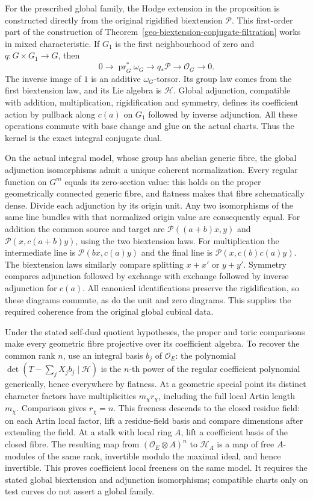 For the prescribed global family, the Hodge extension in the proposition
is constructed directly from the original rigidified biextension
$\mathcal P$. This first-order part of the construction of
Theorem~\ref{geo-biextension-conjugate-filtration} works in mixed
characteristic. If $G_1$ is the first neighbourhood of zero and
$q:G\times G_1\to G$, then
\[
 0\longrightarrow\operatorname{pr}_G^*\omega_G
 \longrightarrow q_*\mathcal P\longrightarrow\mathcal O_G
 \longrightarrow0.
\]
The inverse image of $1$ is an additive $\omega_G$-torsor. Its group
law comes from the first biextension law, and its Lie algebra is
$\mathcal H$. Global adjunction, compatible with addition,
multiplication, rigidification and symmetry, defines its coefficient
action by pullback along $c(a)$ on $G_1$ followed by inverse adjunction.
All these operations commute with base change and glue on the actual
charts. Thus the kernel is the exact integral conjugate dual.

On the actual integral model, whose group has abelian generic fibre,
the global adjunction isomorphisms admit a unique coherent normalization.
Every regular function on $G^m$ equals its zero-section value: this holds
on the proper geometrically connected generic fibre, and flatness makes
that fibre schematically dense. Divide each adjunction by its origin
unit. Any two isomorphisms of the same line bundles with that normalized
origin value are consequently equal. For addition the common source
and target are $\mathcal P((a+b)x,y)$ and $\mathcal P(x,c(a+b)y)$,
using the two biextension laws. For multiplication the intermediate
line is $\mathcal P(bx,c(a)y)$ and the final line is
$\mathcal P(x,c(b)c(a)y)$. The biextension laws similarly compare
splitting $x+x'$ or $y+y'$. Symmetry compares adjunction followed by
exchange with exchange followed by inverse adjunction for $c(a)$.
All canonical identifications preserve the rigidification, so these
diagrams commute, as do the unit and zero diagrams. This supplies the
required coherence from the original global cubical data.

Under the stated self-dual quotient hypotheses, the proper and toric
comparisons make every geometric fibre projective over its coefficient
algebra. To recover the common rank $n$, use an integral basis $b_j$
of $\mathcal O_E$: the polynomial
$\det(T-\sum_jX_jb_j\mid\mathcal H)$ is the $n$-th power of the
regular coefficient polynomial generically, hence everywhere by
flatness. At a geometric special point its distinct character factors
have multiplicities $m_\chi r_\chi$, including the full local Artin
length $m_\chi$. Comparison gives $r_\chi=n$.
This freeness descends to the closed residue field: on each Artin local
factor, lift a residue-field basis and compare dimensions after extending
the field. At a stalk with local ring $A$, lift a coefficient basis of
the closed fibre. The resulting
map from $(\mathcal O_E\otimes A)^n$ to $\mathcal H_A$ is a map of
free $A$-modules of the same rank, invertible modulo the maximal
ideal, and hence invertible. This proves coefficient local freeness
on the same model. It requires the stated global biextension and
adjunction isomorphisms; compatible charts only on test curves do not assert a
global family.

